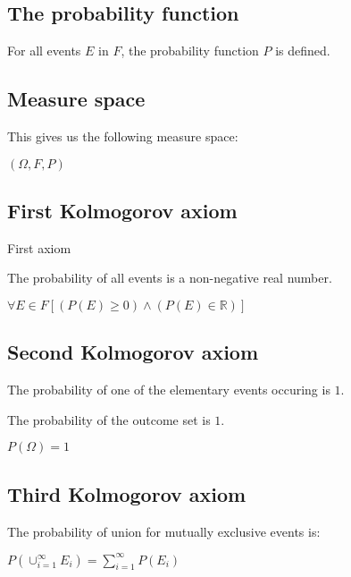 
\subsection{The probability function}

For all events \(E\) in \(F\), the probability function \(P\) is defined.

\subsection{Measure space}

This gives us the following measure space:

\((\Omega, F, P)\)

\subsection{First Kolmogorov axiom}

First axiom

The probability of all events is a non-negative real number.

\(\forall E \in F [(P(E)\ge 0)\land (P(E)\in \mathbb{R})]\)

\subsection{Second Kolmogorov axiom}

The probability of one of the elementary events occuring is \(1\).

The probability of the outcome set is \(1\).

\(P(\Omega )=1\)

\subsection{Third Kolmogorov axiom}

The probability of union for mutually exclusive events is:

\(P(\cup^\infty_{i=1}E_i)=\sum_{i=1}^\infty P(E_i)\)

